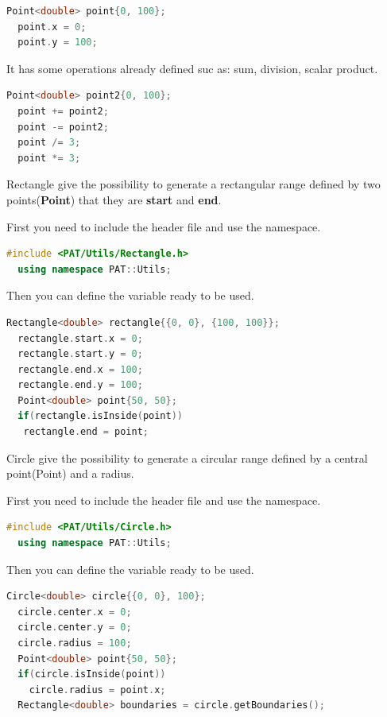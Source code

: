 \begin{lstlisting}[language=c++, gobble=2]
  Point<double> point{0, 100};
  point.x = 0;
  point.y = 100;  
\end{lstlisting}

It has some operations already defined suc as: sum, division, scalar
product.

\begin{lstlisting}[language=c++, gobble=2]
  Point<double> point2{0, 100};
  point += point2;
  point -= point2;
  point /= 3;
  point *= 3;  
\end{lstlisting}


Rectangle give the possibility to generate a rectangular range defined
by two points(\textbf{Point}) that they are \textbf{start} and
\textbf{end}.

First you need to include the header file and use the namespace.

\begin{lstlisting}[language=c++, gobble=2]
  #include <PAT/Utils/Rectangle.h>
  using namespace PAT::Utils;
\end{lstlisting}

Then you can define the variable ready to be used.

\begin{lstlisting}[language=c++, gobble=2]
  Rectangle<double> rectangle{{0, 0}, {100, 100}};
  rectangle.start.x = 0;
  rectangle.start.y = 0;
  rectangle.end.x = 100;
  rectangle.end.y = 100;
  Point<double> point{50, 50};
  if(rectangle.isInside(point))
   rectangle.end = point;
\end{lstlisting}


Circle give the possibility to generate a circular range defined by a
central point(Point) and a radius.

First you need to include the header file and use the namespace.

\begin{lstlisting}[language=c++, gobble=2]
  #include <PAT/Utils/Circle.h>
  using namespace PAT::Utils;
\end{lstlisting}

Then you can define the variable ready to be used.

\begin{lstlisting}[language=c++, gobble=2]
  Circle<double> circle{{0, 0}, 100};
  circle.center.x = 0;
  circle.center.y = 0;
  circle.radius = 100;
  Point<double> point{50, 50};
  if(circle.isInside(point))
    circle.radius = point.x;
  Rectangle<double> boundaries = circle.getBoundaries();
\end{lstlisting}

